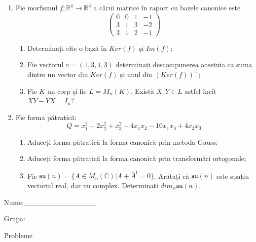 \documentclass{article}
\begin{document}
\begin{enumerate}
 \item Fie morfismul $f:\mathbb{R}^4 \to \mathbb{R}^3$ a cărui matrice în raport cu bazele canonice este
$$\begin{pmatrix}
0&0&1&-1\\
3&1&3&-2\\
3&1&2&-1
\end{pmatrix}$$

\begin{enumerate}
\item Determinați cîte o bază în $Ker(f)$ și $Im(f)$;
\item Fie vectorul $v=(1,3,1,3)$ determinați descompunerea acestuia ca suma dintre un vector din $Ker(f)$ și unul din $(Ker(f))^\perp$;
\item Fie $K$ un corp și fie $L=M_n(K)$. Există $X,Y \in L$ astfel încît $XY-YX=I_n$?  
\end{enumerate}
\item Fie forma pătratică:
$$Q= x_1^2-2x_2^2+x_3^2+4x_1x_2-10x_1x_3+4x_2x_3$$

\begin{enumerate}
\item Aduceți forma pătratică la forma canonică prin metoda Gauss;
\item Aduceți forma pătratică la forma canonică prin transformări ortogonale;
\item Fie $\mathfrak{su}(n)=\{ A \in M_n(\mathbb{C}) | A+\bar{A}^t=0\}$. Arătați că $\mathfrak{su}(n)$ este spațiu vectorial real, dar nu complex.
Determinați $dim_{\mathbb{R}}\mathfrak{su}(n)$.
\end{enumerate}
\end{enumerate}
\newpage
\begin{flushright}
Nume:\_\_\_\_\_\_\_\_\_\_\_\_\_\_
 
 
Grupa:\_\_\_\_\_\_\_\_\_\_\_\_\_\_
\end{flushright}
\begin{center}
\vspace{2cm}
{\Large Probleme}
\vspace{2cm}
\end{center}
\end{document}
